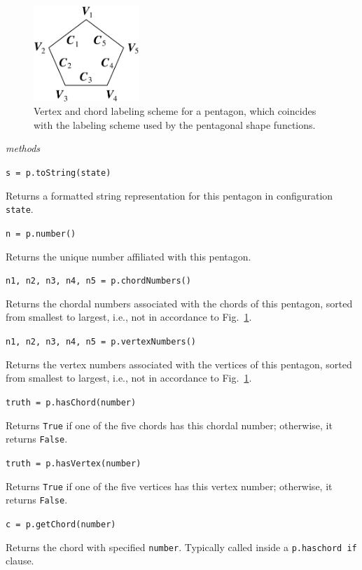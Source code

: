 \begin{figure}
	\centering
	\includegraphics[width=4cm]{figures/pentagon.pdf}
	\caption{Vertex and chord labeling scheme for a pentagon, which coincides with the labeling scheme used by the pentagonal shape functions.}
	\label{figPentagon}
\end{figure}

\medskip\noindent
\textit{methods}

\medskip\noindent
\texttt{s = p.toString(state)}

\medskip\noindent
Returns a formatted string representation for this pentagon in configuration \texttt{state}.

\medskip\noindent
\texttt{n = p.number()}

\medskip\noindent
Returns the unique number affiliated with this pentagon.

\medskip\noindent
\texttt{n1, n2, n3, n4, n5 = p.chordNumbers()}

\medskip\noindent
Returns the chordal numbers associated with the chords of this pentagon, sorted from smallest to largest, i.e., not in accordance to Fig.~\ref{figPentagon}.

\medskip\noindent
\texttt{n1, n2, n3, n4, n5 = p.vertexNumbers()}

\medskip\noindent
Returns the vertex numbers associated with the vertices of this pentagon, sorted from smallest to largest, i.e., not in accordance to Fig.~\ref{figPentagon}.

\medskip\noindent
\texttt{truth = p.hasChord(number)}

\medskip\noindent
Returns \texttt{True} if one of the five chords has this chordal number; otherwise, it returns \texttt{False}.

\medskip\noindent
\texttt{truth = p.hasVertex(number)}

\medskip\noindent
Returns \texttt{True} if one of the five vertices has this vertex number; otherwise, it returns \texttt{False}.

\medskip\noindent
\texttt{c = p.getChord(number)}

\medskip\noindent
Returns the chord with specified \texttt{number}.  Typically called inside a \texttt{p.haschord if} clause.

